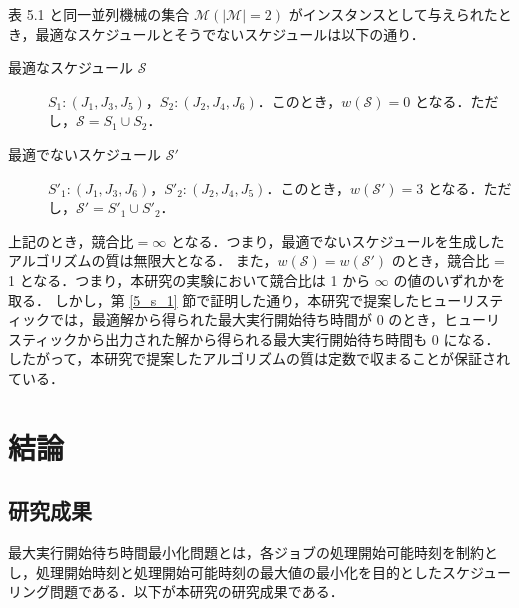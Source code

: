 \documentclass[12pt]{optlab-bachelor}
\begin{document}
表 5.1 と同一並列機械の集合 $\mathcal{M} (|\mathcal{M}| = 2)$ がインスタンスとして与えられたとき，最適なスケジュールとそうでないスケジュールは以下の通り．
\begin{description}
  \item[最適なスケジュール $\mathcal{S}$] $S_1 : (J_1, J_3, J_5)$，$S_2 : (J_2, J_4, J_6)$．このとき，$w(\mathcal{S}) = 0$ となる．ただし，$\mathcal{S} = S_1 \cup S_2$．
  \item[最適でないスケジュール $\mathcal{S}'$] $S'_1 : (J_1, J_3, J_6)$，$S'_2 : (J_2, J_4, J_5)$．このとき，$w(\mathcal{S}') = 3$ となる．ただし，$\mathcal{S}' = S'_1 \cup S'_2$．
\end{description}

上記のとき，$\text{競合比} = \infty$ となる．つまり，最適でないスケジュールを生成したアルゴリズムの質は無限大となる．
また，$w(\mathcal{S}) = w(\mathcal{S}')$ のとき，競合比 = 1 となる．つまり，本研究の実験において競合比は 1 から $\infty$ の値のいずれかを取る．
しかし，第 \ref{5_s_1} 節で証明した通り，本研究で提案したヒューリスティックでは，最適解から得られた最大実行開始待ち時間が 0 のとき，ヒューリスティックから出力された解から得られる最大実行開始待ち時間も 0 になる．したがって，本研究で提案したアルゴリズムの質は定数で収まることが保証されている．

\chapter{結論}\label{c_6}
\section{研究成果}
最大実行開始待ち時間最小化問題とは，各ジョブの処理開始可能時刻を制約とし，処理開始時刻と処理開始可能時刻の最大値の最小化を目的としたスケジューリング問題である．以下が本研究の研究成果である．
\end{document}

